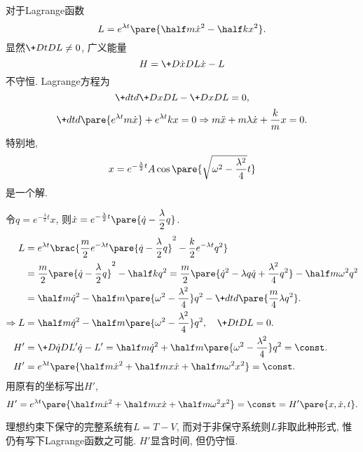 \documentclass[../LectureNotes.tex]{subfiles}
\begin{document}
\begin{sample}
    \begin{ex}
        对于Lagrange函数
        \[ L = e^{\lambda t}\pare{\half m\dot{x}^2 - \half kx^2}. \]
        显然$\displaystyle \+DtDL \neq 0$, 广义能量
        \[ H = \+D{\dot{x}}DL \dot{x} - L \]
        不守恒. Lagrange方程为
        \[ \+dtd{}\+DxDL - \+DxDL = 0, \]
        \[ \+dtd{}\pare{e^{\lambda t} m\dot{x}} + e^{\lambda t} kx = 0 \Rightarrow m\ddot{x} + m\lambda \dot{x} + \frac{k}{m} x = 0. \]
        特别地,
        \[ x = e^{-\frac{\lambda}{2}t}A\cos\pare{\sqrt{\omega^2 - \frac{\lambda^2}{4}} t} \]
        是一个解.
        \par
        令$\displaystyle q = e^{-\frac{\lambda}{2}t}x$, 则$\displaystyle \dot{x} = e^{-\frac{\lambda}{2}t} \pare{\dot{q} - \frac{\lambda}{2}q}$.
        \begin{align*}
            L &= e^{\lambda t} \brac{\frac{m}{2}e^{-\lambda t} \pare{\dot{q} - \frac{\lambda}{2}q}^2 - \frac{k}{2}e^{-\lambda t}q^2} \\
            &= \frac{m}{2} \pare{\dot{q} - \frac{\lambda}{2}q}^2 - \half k q^2 = \frac{m}{2}\pare{\dot{q}^2 - \lambda q\dot{q} + \frac{\lambda^2}{4}q^2} - \half m\omega^2 q^2 \\
            &= \half m\dot{q}^2 - \half m\pare{\omega^2 - \frac{\lambda^2}{4}}q^2 - \+dtd{} \pare{\frac{m}{4}\lambda q^2}. \\
            \Rightarrow L &=\half m\dot{q}^2 - \half m\pare{\omega^2 - \frac{\lambda^2}{4}}q^2,\quad \+D{t}DL = 0. \\ 
            H' &= \+D{\dot{q}}D{L'} \dot{q} - L' = \half m\dot{q}^2 + \half m\pare{\omega^2 - \frac{\lambda^2}{4}}q^2 = \const. \\
            H' &= e^{\lambda t}\pare{\half m\dot{x}^2 + \half mx\dot{x} + \half m\omega^2 x^2} = \const.
        \end{align*}
        用原有的坐标写出$H'$,
        \[ H' = e^{\lambda t}\pare{\half m\dot{x}^2 + \half mx\dot{x} + \half m\omega^2 x^2} = \const = H'\pare{x,\dot{x},t}. \]
    \end{ex}
    \begin{remark}
        理想约束下保守的完整系统有$L = T - V$, 而对于非保守系统则$L$非取此种形式, 惟仍有写下Lagrange函数之可能. $H'$显含时间, 但仍守恒.
    \end{remark}
\end{sample}


\end{document}

